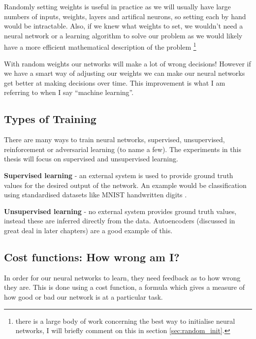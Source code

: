 Randomly setting weights is useful in practice as we will usually have large numbers of inputs, weights, layers and artifical neurons, so setting each by hand would be intractable. Also, if we knew what weights to set, we wouldn't need a neural network or a learning algorithm to solve our problem as we would likely have a more efficient mathematical description of the problem \footnote{there is a large body of work concerning the best way to initialise neural networks, I will briefly comment on this in section \ref{sec:random_init}.} 

With random weights our networks will make a lot of wrong decisions! However if we have a smart way of adjusting our weights we can make our neural networks get better at making decisions over time. This improvement is what I am referring to when I say ``machine learning''.

\subsection{Types of Training}
There are many ways to train neural networks, supervised, unsupervised, reinforcement or 
adversarial learning (to name a few). The experiments in this thesis will focus on supervised and unsupervised learning. %


\textbf{Supervised learning} - an external system is used to provide ground truth values for the desired output of the network. An example would be classification using standardised datasets like MNIST handwritten digits \cite{lecun1998mnist}.


\textbf{Unsupervised learning} - no external system provides ground truth values, instead these are inferred directly from the data. Autoencoders (discussed in great deal in later chapters) are a good example of this.  




\subsection{Cost functions: How wrong am I?}
In order for our neural networks to learn, they need feedback as to how wrong they are. This is done using a cost function, a formula which gives a measure of how good or bad our network is at a particular task.

